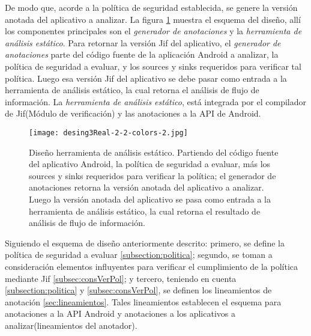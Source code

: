 De modo que, acorde a la política de seguridad establecida, se genere la
versión anotada del aplicativo a analizar.\newline
La figura \ref{fig:desingReal} muestra el esquema del diseño, allí los componentes
principales son el \emph{generador de anotaciones} y la \emph{herramienta de
análisis estático}.\newline 
Para retornar la versión Jif del aplicativo, el \emph{generador de anotaciones}
parte del código fuente de la aplicación Android a analizar, la política de
seguridad a evaluar, y los sources y sinks requeridos para verificar tal
política.\newline 
Luego esa versión Jif del aplicativo se debe pasar como entrada a la herramienta
de análisis estático, la cual retorna el análisis de flujo de
información.\newline 
La \emph{herramienta de análisis estático}, está integrada
por el compilador de Jif(Módulo de verificación) y las anotaciones a la API de
Android.

\begin{figure}[t!]
	\begin{center} 
	\texttt{[image: desing3Real-2-2-colors-2.jpg]} 
	\end{center}
	\caption{Diseño herramienta de análisis estático.\newline
	Partiendo del código fuente del aplicativo Android, la política de seguridad a
	evaluar, más los sources y sinks requeridos para verificar la política; el
	generador de anotaciones retorna la versión anotada del aplicativo a analizar.
	Luego la versión anotada del aplicativo se pasa como entrada a la herramienta
	de análisis estático, la cual retorna el resultado de análisis de flujo de información.}
	\label{fig:desingReal}
\end{figure}

Siguiendo el esquema de diseño anteriormente descrito: primero, se define la
política de seguridad a evaluar \ref{subsection:politica}; segundo, se toman a
consideración elementos influyentes para verificar el cumplimiento de la
política mediante Jif \ref{subsec:consVerPol}; y tercero, teniendo en cuenta
\ref{subsection:politica} y \ref{subsec:consVerPol}, se definen los lineamientos
de anotación \ref{sec:lineamientos}. Tales lineamientos establecen el esquema
para anotaciones a la API Android y anotaciones a los aplicativos a
analizar(lineamientos del anotador).

